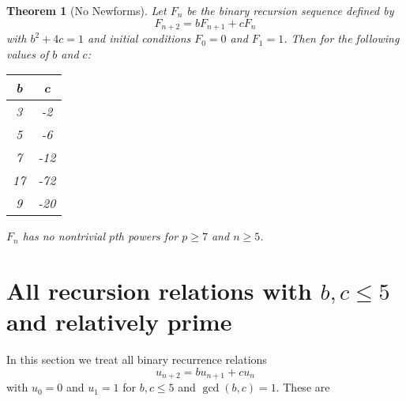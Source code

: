 \documentclass[12pt]{article}
\newtheorem{ithm}{Theorem}
\begin{document}
\begin{ithm}[No Newforms]
Let $F_n$ be the binary recursion sequence defined by 
\[ F_{n+2} = bF_{n+1} +cF_n \]
with $b^2+4c = 1$ and initial conditions $F_0 = 0$ and $F_1=1$.  Then for the following values of $b$ and $c$:
\begin{center}
\begin{tabular}{c | c }
b & c \\  \hline \hline
3 & -2 \\
5 & -6  \\
7 & -12 \\
17 & -72  \\
9 & -20 \\ \hline \hline
\end{tabular}
\end{center}
$F_n$ has no nontrivial $p$th powers for $p \geq 7$ and $n \geq 5$.
\end{ithm}



\section{All recursion relations with $b,c \leq 5$ and relatively prime}

In this section we treat all binary recurrence relations
\[ u_{n+2} = b u_{n+1} + c u_n \]
with $u_0 = 0$ and $u_1=1$ for $b,c \leq 5$ and $\gcd(b,c)=1$.
These are
\end{document}
